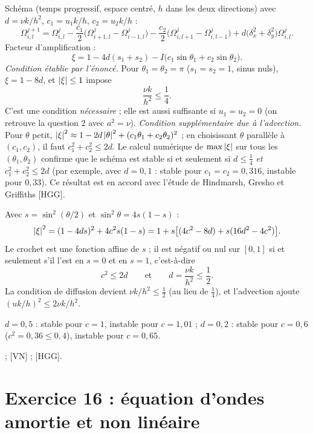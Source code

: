 \Etapes
{} Schéma (temps progressif, espace centré, $h$ dans les deux
directions) avec $d = \nu k/h^2$, $c_1 = u_1k/h$, $c_2 = u_2k/h$ :
\[
  \Omega^{j+1}_{i,l} = \Omega^{j}_{i,l}
  - \frac{c_1}{2}\bigl(\Omega^{j}_{i+1,l} - \Omega^{j}_{i-1,l}\bigr)
  - \frac{c_2}{2}\bigl(\Omega^{j}_{i,l+1} - \Omega^{j}_{i,l-1}\bigr)
  + d\bigl(\delta_x^2 + \delta_y^2\bigr)\Omega^{j}_{i,l} .
\]
 Facteur d'amplification :
\[
  \xi = 1 - 4d(s_1 + s_2) - I\bigl(c_1\sin\theta_1 + c_2\sin\theta_2\bigr).
\]
 \emph{Condition établie par l'énoncé.} Pour $\theta_1 = \theta_2 = \pi$
($s_1 = s_2 = 1$, sinus nuls), $\xi = 1 - 8d$, et $\left|\xi\right| \le 1$ impose
\[
  \frac{\nu k}{h^2} \le \frac14 .
\]
C'est une condition \emph{nécessaire} ; elle est aussi suffisante si
$u_1 = u_2 = 0$ (on retrouve la question 2 avec $a^2 = \nu$).
 \emph{Condition supplémentaire due à l'advection.} Pour $\theta$ petit,
$\left|\xi\right|^2 \approx 1 - 2d\left|\theta\right|^2 + (c_1\theta_1 + c_2\theta_2)^2$ ; en
choisissant $\theta$ parallèle à $(c_1, c_2)$, il faut
$c_1^2 + c_2^2 \le 2d$. Le calcul numérique de $\max\left|\xi\right|$ sur tous les
$(\theta_1, \theta_2)$ confirme que le schéma est stable si et seulement si
$d \le \frac14$ \emph{et} $c_1^2 + c_2^2 \le 2d$ (par exemple, avec $d = 0{,}1$ :
stable pour $c_1 = c_2 = 0{,}316$, instable pour $0{,}33$). Ce résultat est en
accord avec l'étude de Hindmarsh, Gresho et Griffiths [HGG].

Avec $s = \sin^2(\theta/2)$ et $\sin^2\theta = 4s(1-s)$ :
\[
  \left|\xi\right|^2 = (1 - 4ds)^2 + 4c^2s(1-s) = 1 + s\bigl[(4c^2 - 8d) + s(16d^2 - 4c^2)\bigr].
\]
Le crochet est une fonction affine de $s$ ; il est négatif ou nul sur $[0,1]$ si
et seulement s'il l'est en $s = 0$ et en $s = 1$, c'est-à-dire
\[
  c^2 \le 2d \qquad\text{et}\qquad d = \frac{\nu k}{h^2} \le \frac12 .
\]
La condition de diffusion devient $\nu k/h^2 \le \frac12$ (au lieu de
$\frac14$), et l'advection ajoute $(uk/h)^2 \le 2\nu k/h^2$.

\Verif $d = 0{,}5$ : stable pour $c = 1$, instable pour $c = 1{,}01$ ;
$d = 0{,}2$ : stable pour $c = 0{,}6$ ($c^2 = 0{,}36 \le 0{,}4$), instable pour
$c = 0{,}65$.

\Refs {} ; [VN] ; [HGG].

\section{Exercice 16 : équation d'ondes amortie et non linéaire}

